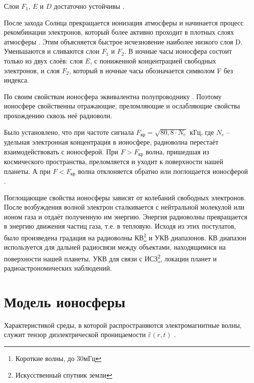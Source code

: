 Слои $F_1$, $E$ и $D$ достаточно устойчивы \cite{Kravcov}.

После захода Солнца прекращается ионизация атмосферы и начинается процесс рекомбинации электронов, который более
активно проходит в плотных слоях атмосферы \cite{Kravcov}. Этим объясняется быстрое исчезновение наиболее 
низкого слоя D. Уменьшаются и сливаются слои $F_1$ и $F_2$. В ночные часы ионосфера состоит только из двух слоёв: 
слоя $E$, с пониженной концентрацией свободных электронов, и слоя $F_2$, который в ночные часы обозначается 
символом F без индекса.

По своим свойствам ионосфера эквивалентна полупроводнику \cite{Kravcov, NeQuick}. Поэтому ионосфере свойственны отражающие, преломляющие и ослабляющие свойства прохождению сквозь неё радиоволн.

Было установлено, что при частоте сигнала $F_{\text{кр}} = \sqrt{80,8 \cdot N_e}$ кГц, 
где $N_e$ -- удельная электронная концентрация в ионосфере, радиоволна перестаёт взаимодействовать с ионосферой. 
При $F > F_{\text{кр}}$ волна, пришедшая из космического пространства, преломляется и уходит к поверхности нашей планеты. 
А при $F < F_{\text{кр}}$ волна отклоняется обратно или поглощается ионосферой \cite{Kravcov}.

Поглощающие свойства ионосферы зависят от колебаний свободных электронов. После возбуждения волной электрон
сталкивается с нейтральной молекулой или ионом газа и отдаёт полученную им энергию. Энергия радиоволны превращается
в энергию движения частиц газа, т.е. в тепловую. Исходя из этих постулатов, было произведена градация на радиоволны
КВ\footnote{Короткие волны, до 30мГц} и УКВ диапазонов. КВ диапазон используется для дальней радиосвязи между
объектами, находящимися на поверхности нашей планеты, УКВ для связи с ИСЗ\footnote{Искусственный спутник земли},
локации планет и радиоастрономических наблюдений.

\section{Модель ионосферы}

Характеристикой среды, в которой распространяются электромагнитные волны, служит тензор диэлектрической проницаемости $\hat{\varepsilon}(r, t)$ \cite{Kravcov}.

